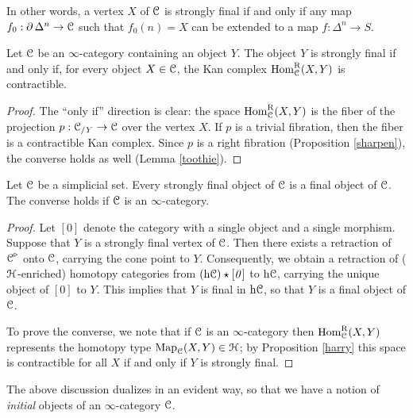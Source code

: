 \begin{Didn't Read}
In other words, a vertex $X$ of $\operatorname{\mathcal{C}}$ is strongly final if and only if any
map $f_0: \operatorname{\partial} \Delta^n \rightarrow \operatorname{\mathcal{C}}$ such that
$f_0(n) = X$ can be extended to a map $f: \Delta^n \rightarrow S$.

\begin{proposition}\label{harry}
Let $\operatorname{\mathcal{C}}$ be an $\infty$-category containing an object $Y$. The object
$Y$ is strongly final if and only if, for every object $X \in \operatorname{\mathcal{C}}$, the Kan
complex $\operatorname{Hom}^{\operatorname{R}}_{\operatorname{\mathcal{C}}}(X,Y)$ is contractible.
\end{proposition}

\begin{proof}
The ``only if'' direction is clear: the space
$\operatorname{Hom}^{\operatorname{R}}_{\operatorname{\mathcal{C}}}(X,Y)$ is the fiber of the projection $p: \operatorname{\mathcal{C}}_{/Y}
\rightarrow \operatorname{\mathcal{C}}$ over the vertex $X$. If $p$ is a trivial
fibration, then the fiber is a contractible Kan complex. Since $p$
is a right fibration (Proposition \ref{sharpen}), the converse holds as well (Lemma \ref{toothie}).
\end{proof}

\begin{corollary}
Let $\operatorname{\mathcal{C}}$ be a simplicial set. Every strongly final object of $\operatorname{\mathcal{C}}$ is a final object of $\operatorname{\mathcal{C}}$. The converse holds if $\operatorname{\mathcal{C}}$ is an $\infty$-category.
\end{corollary}

\begin{proof}
Let $[0]$ denote the category with a single object and a single morphism.
Suppose that $Y$ is a strongly final vertex of $\operatorname{\mathcal{C}}$. Then there exists a retraction of
$\operatorname{\mathcal{C}}^{\triangleright}$ onto $\operatorname{\mathcal{C}}$, carrying the cone point to $Y$. Consequently, we obtain a retraction of ($\operatorname{\mathcal{H}}$-enriched) homotopy categories from $(\rm{h} \it{\operatorname{\mathcal{C}}}) \star [0]$ to $\rm{h} \it{\operatorname{\mathcal{C}}}$, carrying the unique object of $[0]$ to $Y$. This implies that $Y$ is final in $\rm{h} \it{\operatorname{\mathcal{C}}}$, so that $Y$ is a final object of $\operatorname{\mathcal{C}}$.

To prove the converse, we note that if $\operatorname{\mathcal{C}}$ is an $\infty$-category then $\operatorname{Hom}_{\operatorname{\mathcal{C}}}^{\operatorname{R}}(X,Y)$ represents the homotopy type $\operatorname{{Map}}_{\operatorname{\mathcal{C}}}(X,Y) \in \operatorname{\mathcal{H}}$; by Proposition \ref{harry} this space is contractible for all $X$ if and only if $Y$ is strongly final.
\end{proof}

\begin{remark}
The above discussion dualizes in an evident way, so that we have a notion of {\em initial} objects of an $\infty$-category $\operatorname{\mathcal{C}}$.
\end{remark}


\end{Didn't Read}
